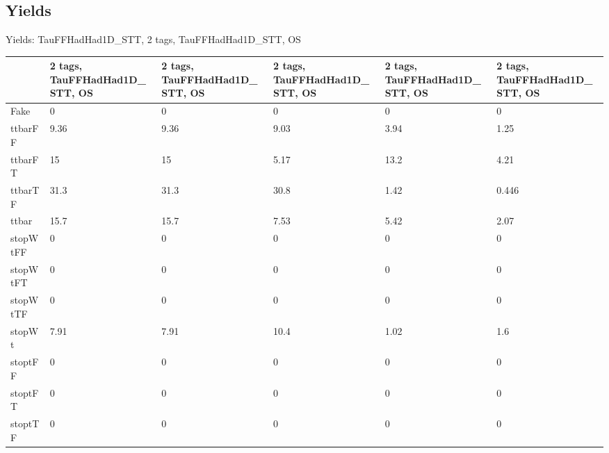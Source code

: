 
\subsection{Yields}

\begin{frame}{Yields: TauFFHadHad1D\_STT, 2 tags, TauFFHadHad1D\_STT, OS}
\begin{center}
  \begin{tabular}{l| >{\centering\let\newline\\\arraybackslash\hspace{0pt}}m{1.4cm}| >{\centering\let\newline\\\arraybackslash\hspace{0pt}}m{1.4cm}| >{\centering\let\newline\\\arraybackslash\hspace{0pt}}m{1.4cm}| >{\centering\let\newline\\\arraybackslash\hspace{0pt}}m{1.4cm}| >{\centering\let\newline\\\arraybackslash\hspace{0pt}}m{1.4cm}}
    & 2 tags, TauFFHadHad1D\_STT, OS & 2 tags, TauFFHadHad1D\_STT, OS & 2 tags, TauFFHadHad1D\_STT, OS & 2 tags, TauFFHadHad1D\_STT, OS & 2 tags, TauFFHadHad1D\_STT, OS \\
 \hline \hline
    Fake& 0 & 0 & 0 & 0 & 0 \\
 \hline
    ttbarFF& 9.36 & 9.36 & 9.03 & 3.94 & 1.25 \\
 \hline
    ttbarFT& 15 & 15 & 5.17 & 13.2 & 4.21 \\
 \hline
    ttbarTF& 31.3 & 31.3 & 30.8 & 1.42 & 0.446 \\
 \hline
    ttbar& 15.7 & 15.7 & 7.53 & 5.42 & 2.07 \\
 \hline
    stopWtFF& 0 & 0 & 0 & 0 & 0 \\
 \hline
    stopWtFT& 0 & 0 & 0 & 0 & 0 \\
 \hline
    stopWtTF& 0 & 0 & 0 & 0 & 0 \\
 \hline
    stopWt& 7.91 & 7.91 & 10.4 & 1.02 & 1.6 \\
 \hline
    stoptFF& 0 & 0 & 0 & 0 & 0 \\
 \hline
    stoptFT& 0 & 0 & 0 & 0 & 0 \\
 \hline
    stoptTF& 0 & 0 & 0 & 0 & 0 \\

\end{tabular}
\end{center}
\end{frame}
